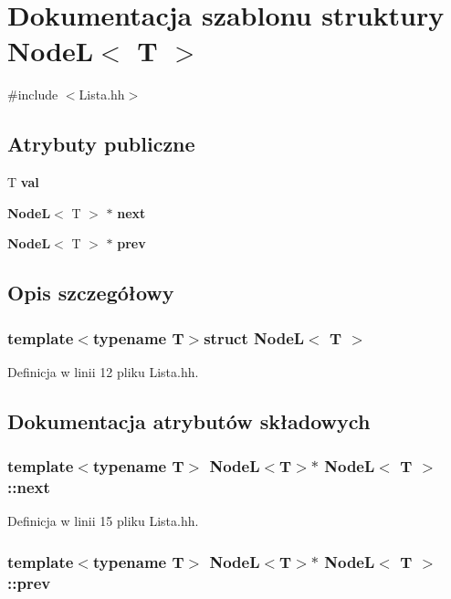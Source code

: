 \section{Dokumentacja szablonu struktury Node\-L$<$ T $>$}
\label{struct_node_l}


{\ttfamily \#include $<$Lista.\-hh$>$}

\subsection*{Atrybuty publiczne}
\begin{DoxyCompactItemize}
\item 
T {\bf val}
\item 
{\bf Node\-L}$<$ T $>$ $\ast$ {\bf next}
\item 
{\bf Node\-L}$<$ T $>$ $\ast$ {\bf prev}
\end{DoxyCompactItemize}


\subsection{Opis szczegółowy}
\subsubsection*{template$<$typename T$>$struct Node\-L$<$ T $>$}



Definicja w linii 12 pliku Lista.\-hh.



\subsection{Dokumentacja atrybutów składowych}
\subsubsection[{next}]{\setlength{\rightskip}{0pt plus 5cm}template$<$typename T$>$ {\bf Node\-L}$<$T$>$$\ast$ {\bf Node\-L}$<$ T $>$\-::next}\label{struct_node_l_a0c3afc9e532c18b261ead8ee2218100d}


Definicja w linii 15 pliku Lista.\-hh.

\subsubsection[{prev}]{\setlength{\rightskip}{0pt plus 5cm}template$<$typename T$>$ {\bf Node\-L}$<$T$>$$\ast$ {\bf Node\-L}$<$ T $>$\-::prev}\label{struct_node_l_aae7a6ca0d9176d32f76164e8bf934372}


